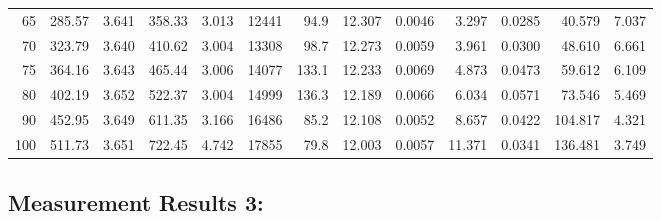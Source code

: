 \documentclass[10pt]{article}
\begin{document}
{\begin{tabular}{|r|rr|rr|rr|rr|rr|r|r|}
       65 &       285.57 &        3.641 &       358.33 &        3.013 &        12441 &         94.9 &       12.307 &       0.0046 &        3.297 &       0.0285 &       40.579 &        7.037 \\
       70 &       323.79 &        3.640 &       410.62 &        3.004 &        13308 &         98.7 &       12.273 &       0.0059 &        3.961 &       0.0300 &       48.610 &        6.661 \\
       75 &       364.16 &        3.643 &       465.44 &        3.006 &        14077 &        133.1 &       12.233 &       0.0069 &        4.873 &       0.0473 &       59.612 &        6.109 \\
       80 &       402.19 &        3.652 &       522.37 &        3.004 &        14999 &        136.3 &       12.189 &       0.0066 &        6.034 &       0.0571 &       73.546 &        5.469 \\
       90 &       452.95 &        3.649 &       611.35 &        3.166 &        16486 &         85.2 &       12.108 &       0.0052 &        8.657 &       0.0422 &      104.817 &        4.321 \\
      100 &       511.73 &        3.651 &       722.45 &        4.742 &        17855 &         79.8 &       12.003 &       0.0057 &       11.371 &       0.0341 &      136.481 &        3.749 \\
\hline
\end{tabular}
}



\subsection*{\large \bf Measurement Results 3:}
\end{document}
